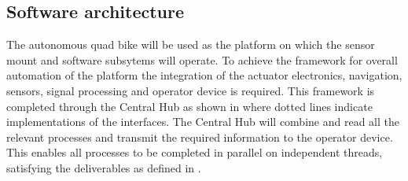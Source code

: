 \documentclass[main.tex]{subfiles}
\begin{document}


\subsection{Software architecture}
The autonomous quad bike will be used as the platform on which the sensor mount and software subsytems will operate. To achieve the framework for overall automation of the platform the integration of the actuator electronics, navigation, sensors, signal processing and operator device is required. This framework is completed through the Central Hub as shown in  where dotted lines indicate implementations of the interfaces. The Central Hub will combine and read all the relevant processes and transmit the required information to the operator device. This enables all processes to be completed in parallel on independent threads, satisfying the deliverables as defined in .
\end{document}
